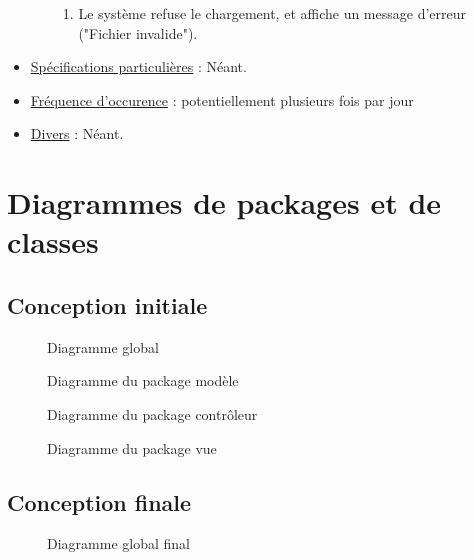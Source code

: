 \documentclass[a4paper]{report}
\newcommand{\adjustimg}{\ifodd\value{page}\hspace*{\dimexpr\evensidemargin-\oddsidemargin}\else\hspace*{-\dimexpr\evensidemargin-\oddsidemargin}\fi}
\newcommand{\centerimg}[2][width=\textwidth]{\makebox[\textwidth]{\adjustimg\texttt{[image: \#2]}}}
\begin{document}
\begin{itemize}[label = \textbullet, font = \color{orange}]
\begin{enumerate}
            \begin{enumerate}
                \item Le système refuse le chargement, et affiche un message
                    d'erreur ("Fichier invalide").
            \end{enumerate}
    \end{enumerate}
    \item \underline{Spécifications particulières} : Néant.
    \item \underline{Fréquence d'occurence} : potentiellement plusieurs fois
        par jour
    \item \underline{Divers} : Néant.
\end{itemize}

\pagebreak

\section{Diagrammes de packages et de classes}

\subsection{Conception initiale}

\begin{figure}[H]
    \noindent\centerimg[width=\paperwidth, height=500pt]{images/ClassDiagram}
    \caption{Diagramme global}
\end{figure}

\begin{figure}[H]
    \noindent\centerimg[width=\paperwidth, height=700pt]{images/model}
    \caption{Diagramme du package modèle}
\end{figure}

\begin{figure}[H]
    \noindent\centerimg{images/controller}
    \caption{Diagramme du package contrôleur}
\end{figure}

\begin{figure}[H]
    \noindent\centerimg{images/view}
    \caption{Diagramme du package vue}
\end{figure}

\subsection{Conception finale}

\begin{figure}[H]
    \noindent\centerimg[width=\paperwidth, height=500pt]{images/fullFinal}
    \caption{Diagramme global final}
\end{figure}
\end{document}
